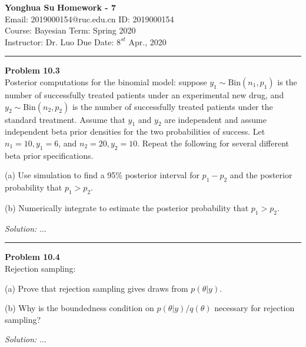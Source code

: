 \documentclass[a4paper, 11pt]{article}
\newenvironment{problem}[2][Problem]
    { \begin{mdframed}[backgroundcolor=gray!20] \textbf{#1 #2} \\}
    {  \end{mdframed}}
\newenvironment{solution}
    {\textit{Solution:}}
    {}
\begin{document}
\noindent
\large\textbf{Yonghua Su} \hfill \textbf{Homework - 7}   \\
Email: 2019000154@ruc.edu.cn \hfill ID: 2019000154 \\
\normalsize Course: Bayesian \hfill Term: Spring 2020\\
Instructor: Dr. Luo  \hfill Due Date: $8^{st}$ Apr., 2020 \\
\noindent\rule{7in}{2.8pt}



\begin{problem}{10.3}
  Posterior computations for the binomial model: suppose $y_1 ∼ \text{Bin}(n_1, p_1)$ is the number of successfully treated patients under an experimental new drug, and $y_2 ∼ \text{Bin}(n_2,p_2)$
  is the number of successfully treated patients under the standard treatment. Assume that $y_1$ and $y_2$ are independent and assume independent beta prior densities for the two probabilities of success. 
  Let $n_1 = 10, y_1 = 6$, and $n_2 = 20, y_2 = 10$. Repeat the following for several different beta prior specifications.

  (a) Use simulation to find a 95\% posterior interval for $p_1 −p_2$ and the posterior probability that $p_1 > p_2$.

  (b) Numerically integrate to estimate the posterior probability that $p_1 > p_2$.

\end{problem}
\begin{solution}
...
\end{solution}

\noindent\rule{7in}{2.8pt}

\begin{problem}{10.4}
  Rejection sampling:

  (a) Prove that rejection sampling gives draws from $p(\theta|y)$.

  (b) Why is the boundedness condition on $p(\theta|y)/q(\theta)$ necessary for rejection sampling?
  
\end{problem}
\begin{solution}
...
\end{solution}
\end{document}
